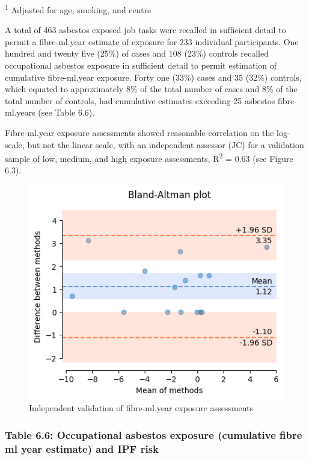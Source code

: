 \textsuperscript{1} Adjusted for age, smoking, and centre

A total of 463 asbestos exposed job tasks were recalled in sufficient
detail to permit a fibre-ml.year estimate of exposure for 233 individual
participants. One hundred and twenty five (25\%) of cases and 108 (23\%)
controls recalled occupational asbestos exposure in sufficient detail to
permit estimation of cumulative fibre-ml.year exposure. Forty one (33\%)
cases and 35 (32\%) controls, which equated to approximately 8\% of the
total number of cases and 8\% of the total number of controls, had
cumulative estimates exceeding 25 asbestos fibre-ml.years (see Table
6.6).

Fibre-ml.year exposure assessments showed reasonable correlation on the
log-scale, but not the linear scale, with an independent assessor (JC)
for a validation sample of low, medium, and high exposure assessments,
R\textsuperscript{2} = 0.63 (see Figure 6.3).

\begin{figure}
\centering
\includegraphics{source/figures/cherrie_validation.png}
\caption{Independent validation of fibre-ml.year exposure assessments}
\end{figure}

\newpage

\hypertarget{table-6.6-occupational-asbestos-exposure-cumulative-fibre-ml-year-estimate-and-ipf-risk}{%
\subsubsection{Table 6.6: Occupational asbestos exposure (cumulative
fibre ml year estimate) and IPF
risk}\label{table-6.6-occupational-asbestos-exposure-cumulative-fibre-ml-year-estimate-and-ipf-risk}}

